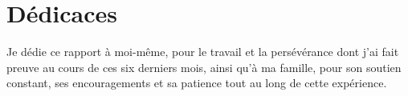\chapter*{Dédicaces}
Je dédie ce rapport à moi-même, pour le travail et la persévérance dont j'ai fait preuve au cours de ces six derniers mois,  
ainsi qu'à ma famille, pour son soutien constant, ses encouragements et sa patience tout au long de cette expérience.
\clearpage

